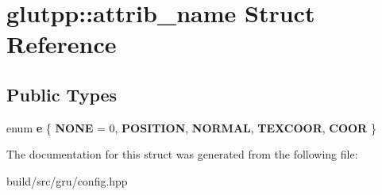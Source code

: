 \hypertarget{structglutpp_1_1attrib__name}{\section{glutpp\-:\-:attrib\-\_\-name \-Struct \-Reference}
\label{structglutpp_1_1attrib__name}
}
\subsection*{\-Public \-Types}
\begin{DoxyCompactItemize}
\item 
enum {\bfseries e} \{ \*
{\bfseries \-N\-O\-N\-E} =  0, 
{\bfseries \-P\-O\-S\-I\-T\-I\-O\-N}, 
{\bfseries \-N\-O\-R\-M\-A\-L}, 
{\bfseries \-T\-E\-X\-C\-O\-O\-R}, 
\*
{\bfseries \-C\-O\-O\-R}
 \}
\end{DoxyCompactItemize}


\-The documentation for this struct was generated from the following file\-:\begin{DoxyCompactItemize}
\item 
build/src/gru/config.\-hpp\end{DoxyCompactItemize}

